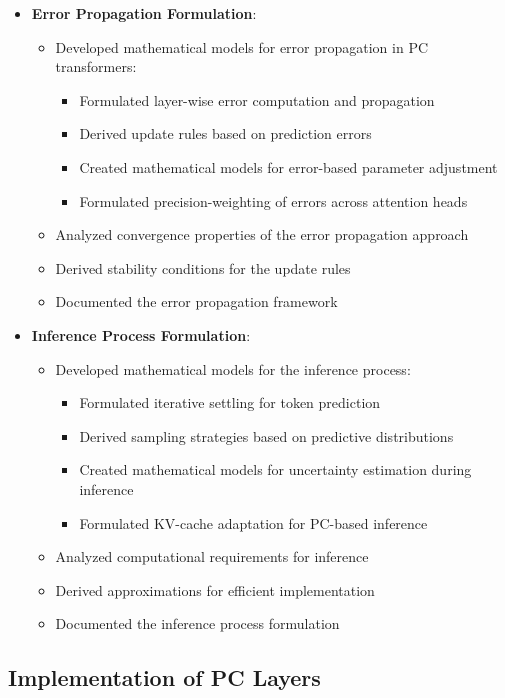 \documentclass{article}
\begin{document}
\begin{itemize}
  \item \textbf{Error Propagation Formulation}:
  \begin{itemize}
    \item Developed mathematical models for error propagation in PC transformers:
    \begin{itemize}
      \item Formulated layer-wise error computation and propagation
      \item Derived update rules based on prediction errors
      \item Created mathematical models for error-based parameter adjustment
      \item Formulated precision-weighting of errors across attention heads
    \end{itemize}
    \item Analyzed convergence properties of the error propagation approach
    \item Derived stability conditions for the update rules
    \item Documented the error propagation framework
  \end{itemize}

  \item \textbf{Inference Process Formulation}:
  \begin{itemize}
    \item Developed mathematical models for the inference process:
    \begin{itemize}
      \item Formulated iterative settling for token prediction
      \item Derived sampling strategies based on predictive distributions
      \item Created mathematical models for uncertainty estimation during inference
      \item Formulated KV-cache adaptation for PC-based inference
    \end{itemize}
    \item Analyzed computational requirements for inference
    \item Derived approximations for efficient implementation
    \item Documented the inference process formulation
  \end{itemize}
\end{itemize}

\subsection{Implementation of PC Layers}
\end{document}
